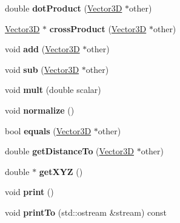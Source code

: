 \begin{DoxyCompactItemize}
\item 
\hypertarget{classVector3D_a0808a8e6004a347d82f9214778b5968f}{double {\bfseries dot\-Product} (\hyperlink{classVector3D}{Vector3\-D} $\ast$other)}\label{classVector3D_a0808a8e6004a347d82f9214778b5968f}

\item 
\hypertarget{classVector3D_a482cd77ce44ea7dd71fd7a43cb7b1cf5}{\hyperlink{classVector3D}{Vector3\-D} $\ast$ {\bfseries cross\-Product} (\hyperlink{classVector3D}{Vector3\-D} $\ast$other)}\label{classVector3D_a482cd77ce44ea7dd71fd7a43cb7b1cf5}

\item 
\hypertarget{classVector3D_a0d14ff1f789254ff90adc22628eb8347}{void {\bfseries add} (\hyperlink{classVector3D}{Vector3\-D} $\ast$other)}\label{classVector3D_a0d14ff1f789254ff90adc22628eb8347}

\item 
\hypertarget{classVector3D_a02364a41693ac080f5adadd776df74b4}{void {\bfseries sub} (\hyperlink{classVector3D}{Vector3\-D} $\ast$other)}\label{classVector3D_a02364a41693ac080f5adadd776df74b4}

\item 
\hypertarget{classVector3D_a3dec11494c99de7370e3877054c3ef13}{void {\bfseries mult} (double scalar)}\label{classVector3D_a3dec11494c99de7370e3877054c3ef13}

\item 
\hypertarget{classVector3D_abfb12ecb9c9beb88e095cc4a1a512d3c}{void {\bfseries normalize} ()}\label{classVector3D_abfb12ecb9c9beb88e095cc4a1a512d3c}

\item 
\hypertarget{classVector3D_ac83e936757114f32bc9d868ea5fabbc2}{bool {\bfseries equals} (\hyperlink{classVector3D}{Vector3\-D} $\ast$other)}\label{classVector3D_ac83e936757114f32bc9d868ea5fabbc2}

\item 
\hypertarget{classVector3D_a42deb992ec2f44abfb5824ea4917135c}{double {\bfseries get\-Distance\-To} (\hyperlink{classVector3D}{Vector3\-D} $\ast$other)}\label{classVector3D_a42deb992ec2f44abfb5824ea4917135c}

\item 
\hypertarget{classVector3D_a89aeff2092d6a954cd449aca97c59197}{double $\ast$ {\bfseries get\-X\-Y\-Z} ()}\label{classVector3D_a89aeff2092d6a954cd449aca97c59197}

\item 
\hypertarget{classVector3D_a37762d009e092a9a9eecb2de03b6f0ec}{void {\bfseries print} ()}\label{classVector3D_a37762d009e092a9a9eecb2de03b6f0ec}

\item 
\hypertarget{classVector3D_a93ebaebe8d2f4f15ef1f79f5fe2cb682}{void {\bfseries print\-To} (std\-::ostream \&stream) const }\label{classVector3D_a93ebaebe8d2f4f15ef1f79f5fe2cb682}

\end{DoxyCompactItemize}

